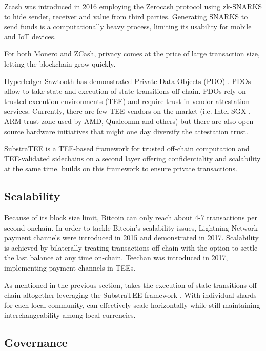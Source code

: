 \documentclass[conference]{IEEEtran}
\begin{document}
Zcash was introduced in 2016 employing the Zerocash protocol \cite{bensasson14} using zk-SNARKS to hide sender, receiver and value from third parties. Generating SNARKS to send funds is a computationally heavy process, limiting its usability for mobile and IoT devices.

For both Monero and ZCash, privacy comes at the price of large transaction size, letting the blockchain grow quickly.

Hyperledger Sawtooth has demonstrated Private Data Objects (PDO) \cite{sawtoothpdo}. PDOs allow to take state and execution of state transitions off chain. PDOs rely on trusted execution environments (TEE) and require trust in vendor attestation services. Currently, there are few TEE vendors on the market (i.e. Intel SGX \cite{costan16}, ARM trust zone \cite{trustzone} used by AMD, Qualcomm and others) but there are also open-source hardware initiatives that might one day diversify the attestation trust. 

SubstraTEE \cite{substraTEE} is a TEE-based framework for trusted off-chain computation and TEE-validated sidechains on a second layer offering confidentiality and scalability at the same time. \encointer builds on this framework to ensure private transactions.
 
\subsection{Scalability}

Because of its block size limit, Bitcoin can only reach about 4-7 transactions per second onchain. 
In order to tackle Bitcoin's scalability issues, Lightning Network payment channels \cite{poon15} were introduced in 2015 and demonstrated in 2017. Scalability is achieved by bilaterally treating transactions off-chain with the option to settle the last balance at any time on-chain. Teechan \cite{lind17} was introduced in 2017, implementing payment channels in TEEs. 

As mentioned in the previous section, \encointer takes the execution of state transitions off-chain altogether leveraging the SubstraTEE framework \cite{substraTEE}. With individual shards for each local community, \encointer can effectively scale horizontally while still maintaining interchangeability among local currencies.

\subsection{Governance}
\end{document}

